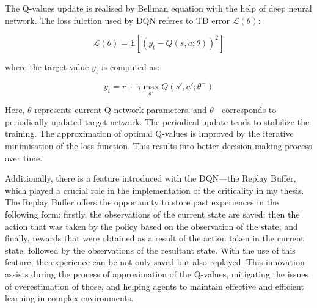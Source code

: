 The Q-values update is realised by Bellman equation with the help of deep neural network. The loss fulction used by DQN referes to TD error $\mathcal{L}(\theta)$:

\begin{equation}
    \mathcal{L}(\theta) = \mathbb{E} \left[ \left( y_t - Q(s, a; \theta) \right)^2 \right]
    \label{eq:dqn_loss}
\end{equation}
    
where the target value $y_t$ is computed as:
    
\begin{equation}
    y_t = r + \gamma \max_{a'} Q(s', a'; \theta^-)
    \label{eq:dqn_target}
\end{equation}
    
Here, $\theta$ represents current Q-network parameters, and $\theta^-$ corresponds to periodically updated target network. The periodical update tends to stabilize the training. The approximation of optimal Q-values is improved by the iterative minimisation of the loss function. This results into better decision-making process over time.

Additionally, there is a feature introduced with the DQN---the Replay Buffer, which played a crucial role in the implementation of the criticality in my thesis. The Replay Buffer offers the opportunity to store past experiences in the following form: firstly, the observations of the current state are saved; then the action that was taken by the policy based on the observation of the state; and finally, rewards that were obtained as a result of the action taken in the current state, followed by the observations of the resultant state. With the use of this feature, the experience can be not only saved but also replayed. This innovation assists during the process of approximation of the Q-values, mitigating the issues of overestimation of those, and helping agents to maintain effective and efficient learning in complex environments.

